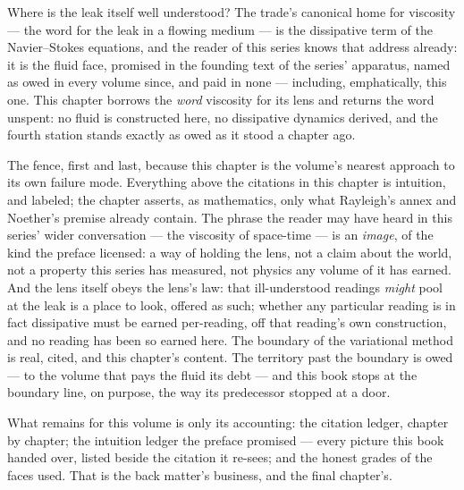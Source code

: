 Where is the leak itself well understood? The trade's canonical home for
viscosity --- the word for the leak in a flowing medium --- is the
dissipative term of the Navier--Stokes equations, and the reader of this
series knows that address already: it is the fluid face, promised in the
founding text of the series' apparatus, named as owed in every volume
since, and paid in none --- including, emphatically, this one. This
chapter borrows the \emph{word} viscosity for its lens and returns the
word unspent: no fluid is constructed here, no dissipative dynamics
derived, and the fourth station stands exactly as owed as it stood a
chapter ago.

\begin{fence}
The fence, first and last, because this chapter is the volume's nearest
approach to its own failure mode. Everything above the citations in
this chapter is intuition, and labeled; the chapter asserts, as
mathematics, only what Rayleigh's annex and Noether's premise already
contain. The phrase the reader may have heard in this series' wider
conversation --- the viscosity of space-time --- is an \emph{image}, of
the kind the preface licensed: a way of holding the lens, not a claim
about the world, not a property this series has measured, not physics
any volume of it has earned. And the lens itself obeys the lens's law:
that ill-understood readings \emph{might} pool at the leak is a place
to look, offered as such; whether any particular reading is in fact
dissipative must be earned per-reading, off that reading's own
construction, and no reading has been so earned here. The boundary of
the variational method is real, cited, and this chapter's content. The
territory past the boundary is owed --- to the volume that pays the
fluid its debt --- and this book stops at the boundary line, on
purpose, the way its predecessor stopped at a door.
\end{fence}

What remains for this volume is only its accounting: the citation
ledger, chapter by chapter; the intuition ledger the preface promised
--- every picture this book handed over, listed beside the citation it
re-sees; and the honest grades of the faces used. That is the back
matter's business, and the final chapter's.
